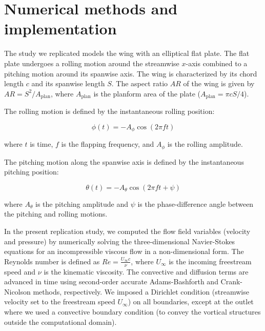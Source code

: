 \section{Numerical methods and implementation}

The study we replicated models the wing with an elliptical flat plate.
The flat plate undergoes a rolling motion around the streamwise $x$-axis combined to a pitching motion around its spanwise axis.
The wing is characterized by its chord length $c$ and its spanwise length $S$.
The aspect ratio $AR$ of the wing is given by $AR = S^2 / A_\text{plan}$, where $A_\text{plan}$ is the planform area of the plate ($A_\text{plan} = \pi c S / 4$).

The rolling motion is defined by the instantaneous rolling position:

\begin{equation}
  \phi (t) = -A_\phi \cos \left( 2 \pi f t \right)
\end{equation}

where $t$ is time, $f$ is the flapping frequency, and $A_\phi$ is the rolling amplitude.

The pitching motion along the spanwise axis is defined by the instantaneous pitching position:

\begin{equation}
  \theta (t) = -A_\theta \cos(2 \pi f t + \psi)
\end{equation}

where $A_\theta$ is the pitching amplitude and $\psi$ is the phase-difference angle between the pitching and rolling motions.

In the present replication study, we computed the flow field variables (velocity and pressure) by numerically solving the three-dimensional Navier-Stokes equations for an incompressible viscous flow in a non-dimensional form.
The Reynolds number is defined as $Re = \frac{U_\infty c}{\nu}$, where $U_\infty$ is the incoming freestream speed and $\nu$ is the kinematic viscosity.
The convective and diffusion terms are advanced in time using second-order accurate Adams-Bashforth and Crank-Nicolson methods, respectively.
We imposed a Dirichlet condition (streamwise velocity set to the freestream speed $U_\infty$) on all boundaries, except at the outlet where we used a convective boundary condition (to convey the vortical structures outside the computational domain).

